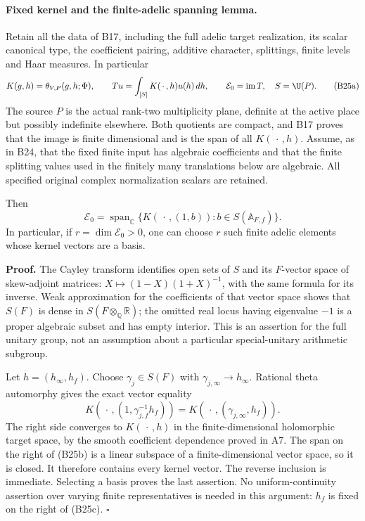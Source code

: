 \documentclass[11pt]{article}
\newcommand{\Q}{\mathbb Q}\newcommand{\C}{\mathbb C}\newcommand{\Z}{\mathbb Z}\newcommand{\R}{\mathbb R}\newcommand{\A}{\mathbb A}\newcommand{\OO}{\mathcal O}
\theoremstyle{definition}\newtheorem{definition}[theorem]{Definition}\newtheorem{remark}[theorem]{Remark}
\begin{document}
\paragraph{Fixed kernel and the finite-adelic spanning lemma.}
Retain all the data of B17, including the full adelic
target realization, its scalar canonical type, the
coefficient pairing, additive character, splittings,
finite levels and Haar measures.  In particular
\[
 K(g,h)=\theta_{V,P}(g,h;\Phi),\qquad
 Tu=\int_{[S]}K(\,\cdot\,,h)u(h)\,dh,
 \qquad \mathcal E_0=\operatorname{im}T,
 \quad S=\U(P).
 \tag{B25a}
\]
The source $P$ is the actual rank-two multiplicity
plane, definite at the active place but possibly
indefinite elsewhere.  Both quotients are compact,
and B17 proves that the image is finite dimensional
and is the span of all $K(\,\cdot\,,h)$.
Assume, as in B24, that the fixed finite input has
algebraic coefficients and that the finite splitting
values used in the finitely many translations below
are algebraic.  All specified original complex
normalization scalars are retained.

Then
\[
 \mathcal E_0=
  \operatorname{span}_{\C}
       \{K(\,\cdot\,,(1,b)):b\in S(\A_{F,f})\}.
 \tag{B25b}
\]
In particular, if $r=\dim\mathcal E_0>0$, one can
choose $r$ such finite adelic elements whose kernel
vectors are a basis.

\textbf{Proof.}
The Cayley transform identifies open sets of $S$
and its $F$-vector space of skew-adjoint matrices:
$X\mapsto(1-X)(1+X)^{-1}$, with the same formula
for its inverse.  Weak approximation for the
coefficients of that vector space shows that
$S(F)$ is dense in $S(F\otimes_\Q\R)$; the omitted
real locus having eigenvalue $-1$ is a proper
algebraic subset and has empty interior.  This is
an assertion for the full unitary group, not an
assumption about a particular special-unitary
arithmetic subgroup.

Let $h=(h_\infty,h_f)$.  Choose
$\gamma_j\in S(F)$ with
$\gamma_{j,\infty}\to h_\infty$.  Rational theta
automorphy gives the exact vector equality
\[
 K(\,\cdot\,,(1,\gamma_{j,f}^{-1}h_f))
       =K(\,\cdot\,,(\gamma_{j,\infty},h_f)).
 \tag{B25c}
\]
The right side converges to $K(\,\cdot\,,h)$ in
the finite-dimensional holomorphic target space,
by the smooth coefficient dependence proved in A7.
The span on the right of (B25b) is a linear
subspace of a finite-dimensional vector space,
so it is closed.  It therefore contains every
kernel vector.  The reverse inclusion is immediate.
Selecting a basis proves the last assertion.
No uniform-continuity assertion over varying finite
representatives is needed in this argument: $h_f$
is fixed on the right of (B25c). \hfill$\square$
\end{document}
